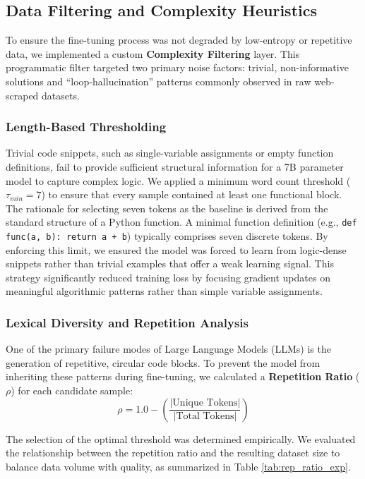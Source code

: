 \subsection{Data Filtering and Complexity Heuristics}
To ensure the fine-tuning process was not degraded by low-entropy or repetitive data, we implemented a custom \textbf{Complexity Filtering} layer. This programmatic filter targeted two primary noise factors: trivial, non-informative solutions and ``loop-hallucination'' patterns commonly observed in raw web-scraped datasets.

\subsubsection{Length-Based Thresholding}
Trivial code snippets, such as single-variable assignments or empty function definitions, fail to provide sufficient structural information for a 7B parameter model to capture complex logic. We applied a minimum word count threshold ($\tau_{min} = 7$) to ensure that every sample contained at least one functional block. The rationale for selecting seven tokens as the baseline is derived from the standard structure of a Python function. A minimal function definition (e.g., \texttt{def func(a, b): return a + b}) typically comprises seven discrete tokens. By enforcing this limit, we ensured the model was forced to learn from logic-dense snippets rather than trivial examples that offer a weak learning signal. This strategy significantly reduced training loss by focusing gradient updates on meaningful algorithmic patterns rather than simple variable assignments.
\subsubsection{Lexical Diversity and Repetition Analysis}
One of the primary failure modes of Large Language Models (LLMs) is the generation of repetitive, circular code blocks. To prevent the model from inheriting these patterns during fine-tuning, we calculated a \textbf{Repetition Ratio} ($\rho$) for each candidate sample:
\begin{equation}
\rho = 1.0 - \left( \frac{|\text{Unique Tokens}|}{|\text{Total Tokens}|} \right)
\end{equation}

The selection of the optimal threshold was determined empirically. We evaluated the relationship between the repetition ratio and the resulting dataset size to balance data volume with quality, as summarized in Table \ref{tab:rep_ratio_exp}.

